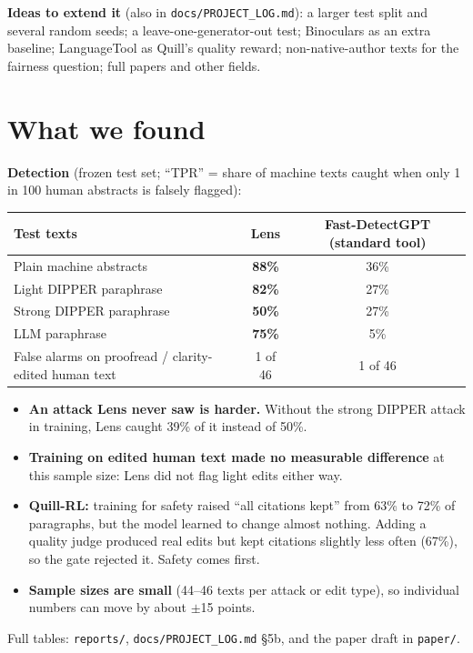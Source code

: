 \documentclass[11pt]{article}
\newcommand{\cm}[1]{\texttt{#1}}
\begin{document}
\textbf{Ideas to extend it} (also in \cm{docs/PROJECT\_LOG.md}): a larger test split and several random seeds; a leave-one-generator-out test; Binoculars as an extra baseline; LanguageTool as Quill's quality reward; non-native-author texts for the fairness question; full papers and other fields.

\section{What we found}
\label{sec:results}

\textbf{Detection} (frozen test set; ``TPR'' = share of machine texts caught when only 1 in 100 human abstracts is falsely flagged):

\begin{tabularx}{\linewidth}{@{}X cc@{}}
\toprule
Test texts & Lens & Fast-DetectGPT (standard tool) \\
\midrule
Plain machine abstracts & \textbf{88\%} & 36\% \\
Light DIPPER paraphrase & \textbf{82\%} & 27\% \\
Strong DIPPER paraphrase & \textbf{50\%} & 27\% \\
LLM paraphrase & \textbf{75\%} & 5\% \\
False alarms on proofread / clarity-edited human text & 1 of 46 & 1 of 46 \\
\bottomrule
\end{tabularx}

\begin{itemize}
  \item \textbf{An attack Lens never saw is harder.} Without the strong DIPPER attack in training, Lens caught 39\% of it instead of 50\%.
  \item \textbf{Training on edited human text made no measurable difference} at this sample size: Lens did not flag light edits either way.
  \item \textbf{Quill-RL:} training for safety raised ``all citations kept'' from 63\% to 72\% of paragraphs, but the model learned to change almost nothing. Adding a quality judge produced real edits but kept citations slightly less often (67\%), so the gate rejected it. Safety comes first.
  \item \textbf{Sample sizes are small} (44--46 texts per attack or edit type), so individual numbers can move by about $\pm$15 points.
\end{itemize}
Full tables: \cm{reports/}, \cm{docs/PROJECT\_LOG.md} \S5b, and the paper draft in \cm{paper/}.
\end{document}
